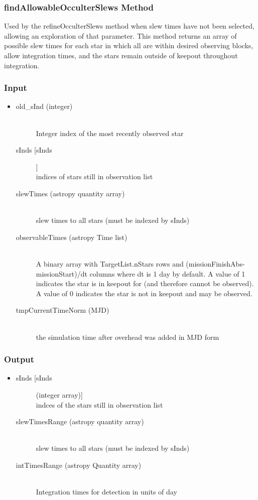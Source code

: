 \documentclass[cleanfoot]{asme2ej}
\begin{document}
\subsubsection{findAllowableOcculterSlews Method} \label{sec:findAllowableOcculterSlewstask}
Used by the refineOcculterSlews method when slew times have not been selected, allowing an exploration of that parameter. This method returns an array of possible slew times for each star in which all are within desired observing blocks, allow integration times, and the stars remain outside of keepout throughout integration. 
\subsubsection*{Input}
\begin{itemize}
\item
\begin{description}
    \item[old\_sInd (integer)] \hfill \\ Integer index of the most recently observed star
    \item[sInds [sInds]] \hfill \\ indices of stars still in observation list
    \item[slewTimes (astropy quantity array)] \hfill \\ slew times to all stars (must be indexed by sInds)
    \item[observableTimes (astropy Time list)] \hfill \\ A binary array with TargetList.nStars rows and (missionFinishAbs-missionStart)/dt columns where dt is 1 day by default. A value of 1 indicates the star is in keepout for (and therefore cannot be observed). A value of 0 indicates the star is not in keepout and may be observed.
    \item[tmpCurrentTimeNorm (MJD)] \hfill \\ the simulation time after overhead was added in MJD form
\end{description}
\end{itemize}
\subsubsection*{Output}
\begin{itemize}
\item
\begin{description}
    \item[sInds [sInds] (integer array)] \hfill \\ indces of the stars still in observation list
    \item[slewTimesRange (astropy quantity array)] \hfill \\ slew times to all stars (must be indexed by sInds)
    \item[intTimesRange (astropy Quantity array)] \hfill \\ Integration times for detection in units of day
    
\end{description}
\end{itemize}
\end{document}
